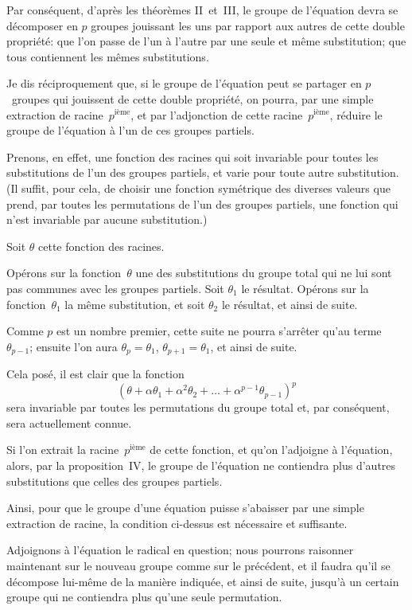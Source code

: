 \documentclass[leqno,12pt]{book}[2005/09/16]
\let\Primo=\primo
\let\Secundo=\secundo
\renewcommand{\primo}{{\upshape\Primo}}
\renewcommand{\secundo}{{\upshape\Secundo}}
\begin{document}
Par conséquent, d'après les théorèmes II~et~III, le groupe de
l'équation devra se décomposer en $p$ groupes jouissant les uns par
rapport aux autres de cette double propriété: \primo que l'on passe
de l'un à l'autre par une seule et même substitution; \secundo que tous
contiennent les mêmes substitutions.

Je dis réciproquement que, si le groupe de l'équation peut se
partager en $p$~groupes qui jouissent de cette double propriété, on
pourra, par une simple extraction de racine~$p^{\text{ième}}$, et par l'adjonction
de cette racine~$p^{\text{ième}}$, réduire le groupe de l'équation à l'un de
ces groupes partiels.

Prenons, en effet, une fonction des racines qui soit invariable
pour toutes les substitutions de l'un des groupes partiels, et varie
pour toute autre substitution. (Il suffit, pour cela, de choisir une
fonction symétrique des diverses valeurs que prend, par toutes les
permutations de l'un des groupes partiels, une fonction qui n'est
invariable par aucune substitution.)

Soit $\theta$ cette fonction des racines.

Opérons sur la fonction~$\theta$ une des substitutions du groupe total
qui ne lui sont pas communes avec les groupes partiels. Soit $\theta_{1}$ le
résultat. Opérons sur la fonction~$\theta_{1}$ la même substitution, et
soit $\theta_{2}$ le résultat, et ainsi de suite.

Comme $p$ est un nombre premier, cette suite ne pourra s'arrêter
qu'au terme~$\theta_{p-1}$; ensuite l'on aura $\theta_{p} = \theta_{1}$, $\theta_{p+1}=\theta_{1}$, et
ainsi de suite.

Cela posé, il est clair que la fonction
\[
(\theta + \alpha\theta_{1}
        + \alpha^{2}\theta_{2} + \dots
        + \alpha^{p-1}\theta_{p-1})^{p}
\]
sera invariable par toutes les permutations du groupe total et, par
conséquent, sera actuellement connue.

Si l'on extrait la racine~$p^\text{ième}$ de cette fonction, et qu'on l'adjoigne
à l'équation, alors, par la proposition~IV, le groupe de
l'équation ne contiendra plus d'autres substitutions que celles des
groupes partiels.

Ainsi, pour que le groupe d'une équation puisse s'abaisser par
une simple extraction de racine, la condition ci-dessus est nécessaire
et suffisante.

Adjoignons à l'équation le radical en question; nous pourrons
raisonner maintenant sur le nouveau groupe comme sur le précédent,
et il faudra qu'il se décompose lui-même de la manière
indiquée, et ainsi de suite, jusqu'à un certain groupe qui ne contiendra
plus qu'une seule permutation.
\end{document}
